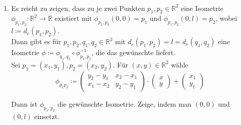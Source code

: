 \begin{solution}
  \
  \begin{enumerate}[label= (\alph*)]
    \item Es reicht zu zeigen, dass zu je zwei Punkten \( p_1, p_2 \in \mathbb{R}^2 \) eine Isometrie \( \phi_{p_1,p_2}: \mathbb{R}^2 \to \mathbb{R} \) existiert mit \( \phi_{p_1,p_2}(0,0) = p_1 \) und \( \phi_{p_1,p_2}(0,l) = p_2 \), wobei \(l \coloneqq d_e(p_1,p_2) \). \\
    Dann gibt es für \( p_1,p_2,q_1,q_2 \in \mathbb{R}^2 \) mit \( d_e(p_1,p_2) = l = d_e(q_1,q_2) \) eine Isometrie \( \phi \coloneqq \phi_{q_1,q_2} \circ \phi_{p_1,p_2}^{-1} \), die das gewünschte liefert. \\ 
    Sei \( p_1 = (x_1,y_1), p_2 = (x_2, y_2) \). Für \( (x,y) \in \mathbb{R}^2 \) wähle
    \begin{equation*}
      \phi_{p_1p_2} \coloneqq \begin{pmatrix}
        y_2-y_1 & x_2 - x_1 \\
        x_1 - x_2 & y_2 -y_1
      \end{pmatrix} \cdot
      \begin{pmatrix}
        x \\ y 
      \end{pmatrix} + 
      \begin{pmatrix}
        x_1 \\ y_1
      \end{pmatrix}
    \end{equation*}
    
    Dann ist \( \phi_{p_1,p_2} \) die gewünschte Isometrie. Zeige, indem man \( (0,0) \) und \( (0,l) \) einsetzt.
    

\end{enumerate}
\end{solution}

